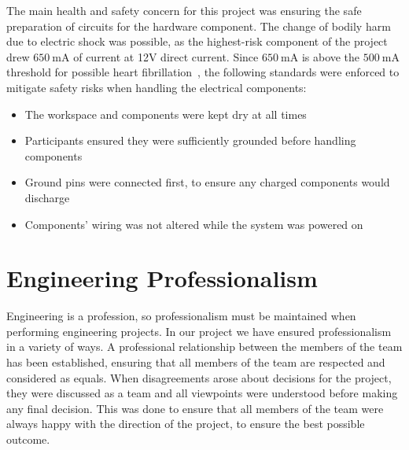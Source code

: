 \documentclass[12pt]{report}
\let\Oldsection\section
\renewcommand{\section}{\FloatBarrier\Oldsection}
\begin{document}
The main health and safety concern for this project was ensuring the safe preparation of circuits for the hardware 
component. The change of bodily harm due to electric shock was possible, as the highest-risk component of the project 
drew $\SI{650}{\milli\ampere}$ of current at 12V direct current. Since $\SI{650}{\milli\ampere}$ is above the 
$\SI{500}{\milli\ampere}$ threshold for possible heart fibrillation~\autocite{CURRENTDANGER}, the following standards
were enforced to mitigate safety risks when handling the electrical components:
\begin{itemize}
    \item The workspace and components were kept dry at all times
    \item Participants ensured they were sufficiently grounded before handling components
    \item Ground pins were connected first, to ensure any charged components would discharge
    \item Components' wiring was not altered while the system was powered on
\end{itemize}


\section{Engineering Professionalism} \label{engineering-professionalism}


Engineering is a profession, so professionalism must be maintained when performing engineering projects. In our project
we have ensured professionalism in a variety of ways. A professional relationship between the members of the team has
been established, ensuring that all members of the team are respected and considered as equals. When disagreements arose
about decisions for the project, they were discussed as a team and all viewpoints were understood before making any final
decision. This was done to ensure that all members of the team were always happy with the direction of the project, to
ensure the best possible outcome.
\end{document}
